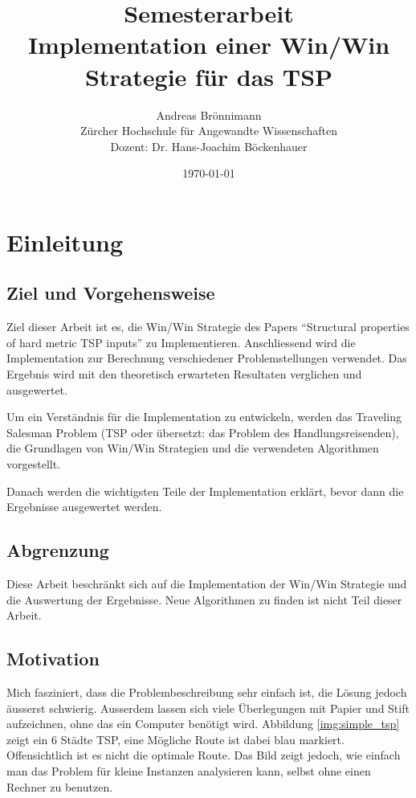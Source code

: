 \documentclass[11pt,a4paper]{article}
\title {Semesterarbeit\\
Implementation einer Win/Win Strategie für das TSP\\}
\author {Andreas Brönnimann\\
Zürcher Hochschule für Angewandte Wissenschaften\\
Dozent: Dr. Hans-Joachim Böckenhauer}
\date {\today}
\begin{document}
\nocite{*}

\maketitle
\setcounter{page}{0}
\thispagestyle{empty}
\newpage

\tableofcontents
\newpage
\section{Einleitung}
\subsection{Ziel und Vorgehensweise}
Ziel dieser Arbeit ist es, die Win/Win Strategie des Papers "`Structural properties of hard metric TSP inputs"'\cite{moemke11} zu Implementieren. Anschliessend wird die Implementation zur Berechnung verschiedener Problemstellungen verwendet. Das Ergebnis wird mit den theoretisch erwarteten Resultaten verglichen und ausgewertet.

Um ein Verständnis für die Implementation zu entwickeln, werden das Traveling Salesman Problem (TSP oder übersetzt: das Problem des Handlungsreisenden), die Grundlagen von Win/Win Strategien und die verwendeten Algorithmen vorgestellt. 

Danach werden die wichtigsten Teile der Implementation erklärt, bevor dann die Ergebnisse ausgewertet werden. 

\subsection{Abgrenzung}
Diese Arbeit beschränkt sich auf die Implementation der Win/Win Strategie und die Auswertung der Ergebnisse. Neue Algorithmen zu finden ist nicht Teil dieser Arbeit.

\subsection{Motivation}
Mich fasziniert, dass die Problembeschreibung sehr einfach ist, die Lösung jedoch äusserst schwierig.
Ausserdem lassen sich viele Überlegungen mit Papier und Stift aufzeichnen, ohne das ein Computer benötigt wird. 
Abbildung \ref{img:simple_tsp} zeigt ein 6 Städte TSP, eine Mögliche Route ist dabei blau markiert. Offensichtlich ist es nicht die optimale Route. Das Bild zeigt jedoch, wie einfach man das Problem für kleine Instanzen analysieren kann, selbst ohne einen Rechner zu benutzen.
\end{document}
